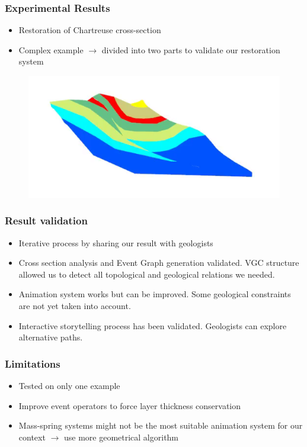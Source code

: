 \documentclass{beamer}
\begin{document}
	\begin{frame}
	\frametitle{Experimental Results}
	\begin{itemize}
	\item Restoration of Chartreuse cross-section
	\item Complex example $\rightarrow$ divided into two parts to validate our restoration system
	\end{itemize}
	\begin{figure}[H]
	\centering
	\href{chartreusedoite.flv}
	{\includegraphics[width=.45\textwidth]{chartreusedroite0.png}}
	\end{figure}

\begin{figure}[H]
	\centering
	\href{chartreusedoite-rev.mp4}
	{}
	\end{figure}
	\end{frame}
	
	\begin{frame}
	\frametitle{Result validation}
	\begin{itemize}
	\item Iterative process by sharing our result with geologists
	\item Cross section analysis and Event Graph generation validated. VGC structure allowed us to detect all topological and geological relations we needed.
	\item Animation system works but can be improved. Some geological constraints are not yet taken into account.
	\item Interactive storytelling process has been validated. Geologists can explore alternative paths.
	\end{itemize}
	\end{frame}
	
	\begin{frame}
	\frametitle{Limitations}
	\begin{itemize}
	\item Tested on only one example
	\item Improve event operators to force layer thickness conservation 
	\item Mass-spring systems might not be the most suitable animation system for our context $\longrightarrow$ use more geometrical algorithm
	\end{itemize}
	\end{frame}
	
\end{document}
